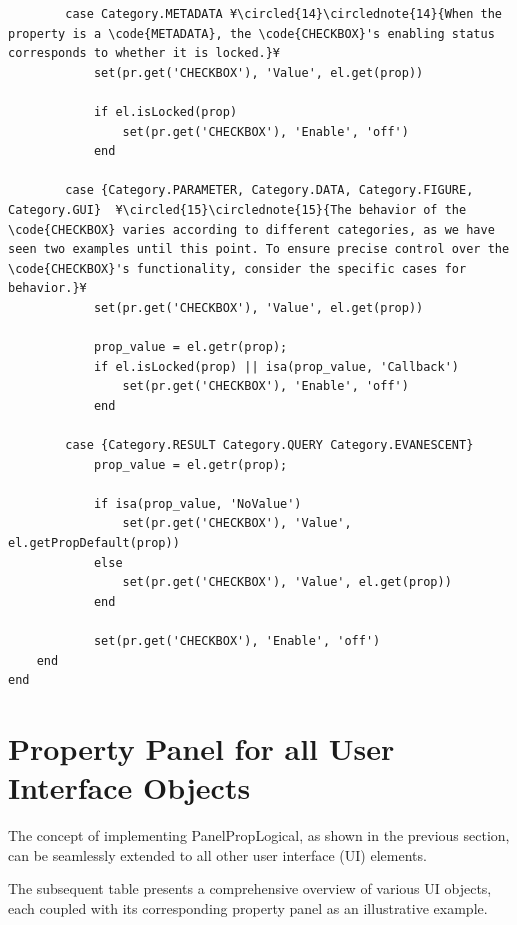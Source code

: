 \documentclass{tufte-handout}
\begin{document}
\begin{lstlisting}
        case Category.METADATA ¥\circled{14}\circlednote{14}{When the property is a \code{METADATA}, the \code{CHECKBOX}'s enabling status corresponds to whether it is locked.}¥
            set(pr.get('CHECKBOX'), 'Value', el.get(prop))

            if el.isLocked(prop)
                set(pr.get('CHECKBOX'), 'Enable', 'off')
            end
            
        case {Category.PARAMETER, Category.DATA, Category.FIGURE, Category.GUI}  ¥\circled{15}\circlednote{15}{The behavior of the \code{CHECKBOX} varies according to different categories, as we have seen two examples until this point. To ensure precise control over the \code{CHECKBOX}'s functionality, consider the specific cases for behavior.}¥
            set(pr.get('CHECKBOX'), 'Value', el.get(prop))

            prop_value = el.getr(prop);
            if el.isLocked(prop) || isa(prop_value, 'Callback')
                set(pr.get('CHECKBOX'), 'Enable', 'off')
            end
            
        case {Category.RESULT Category.QUERY Category.EVANESCENT}
            prop_value = el.getr(prop);

            if isa(prop_value, 'NoValue')
                set(pr.get('CHECKBOX'), 'Value', el.getPropDefault(prop))
            else
                set(pr.get('CHECKBOX'), 'Value', el.get(prop))
            end
            
            set(pr.get('CHECKBOX'), 'Enable', 'off')
    end
end

\end{lstlisting}



\clearpage

\section{Property Panel for all User Interface Objects}

The concept of implementing PanelPropLogical, as shown in the previous section, can be seamlessly extended to all other user interface (UI) elements.

The subsequent table presents a comprehensive overview of various UI objects, each coupled with its corresponding property panel as an illustrative example.
\end{document}
